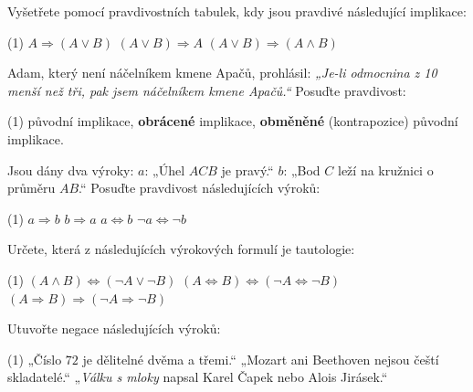 \documentclass[12pt,a4paper]{article}
\begin{document}
\begin{exercise}
Vyšetřete pomocí pravdivostních tabulek, kdy jsou pravdivé následující implikace:
\begin{tasks}(1)
\task $A \Rightarrow (A \lor B)$
\task $(A \lor B) \Rightarrow A$
\task $(A \lor B) \Rightarrow (A \land B)$
\end{tasks}
\end{exercise}

\begin{exercise}
Adam, který není náčelníkem kmene Apačů, prohlásil:  
\emph{„Je-li odmocnina z 10 menší než tři, pak jsem náčelníkem kmene Apačů.“}  
Posuďte pravdivost:
\begin{tasks}(1)
\task původní implikace,
\task \textbf{obrácené} implikace,
\task \textbf{obměněné} (kontrapozice) původní implikace.
\end{tasks}
\end{exercise}

\begin{exercise}
Jsou dány dva výroky:  
$a$: „Úhel $ACB$ je pravý.“ \quad $b$: „Bod $C$ leží na kružnici o průměru $AB$.“
Posuďte pravdivost následujících výroků:
\begin{tasks}(1)
\task $a \Rightarrow b$
\task $b \Rightarrow a$
\task $a \Leftrightarrow b$
\task $\neg a \Leftrightarrow \neg b$
\end{tasks}
\end{exercise}

\begin{exercise}
Určete, která z následujících výrokových formulí je tautologie:
\begin{tasks}(1)
\task $(A \land B) \Leftrightarrow (\neg A \lor \neg B)$
\task $(A \Leftrightarrow B) \Leftrightarrow (\neg A \Leftrightarrow \neg B)$
\task $(A \Rightarrow B) \Rightarrow (\neg A \Rightarrow \neg B)$
\end{tasks}
\end{exercise}

\begin{exercise}
Utuvořte negace následujících výroků:
\begin{tasks}(1)
\task „Číslo $72$ je dělitelné dvěma a třemi.“
\task „Mozart ani Beethoven nejsou čeští skladatelé.“
\task „\emph{Válku s mloky} napsal Karel Čapek nebo Alois Jirásek.“
\end{tasks}
\end{exercise}
\end{document}
